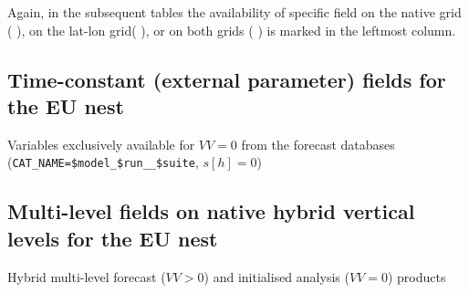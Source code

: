 Again, in the subsequent tables the availability of specific field on the native grid ($\,$\markRed$\,$), 
on the lat-lon grid($\,$\markBlue$\,$), or on both grids ($\,$\markRed\markBlue$\,$) is marked in the leftmost column.


\subsection{Time-constant (external parameter) fields for the EU nest}

\renewcommand{\onlyglb}[1]{}
\renewcommand{\onlyloc}[1]{#1}
%
\begin{vartable}{\caption{Variables exclusively available for $VV=0$ from the forecast databases (\texttt{CAT\_NAME=\$model\_\$run\_\_\$suite}, $s[h]=0$)}\label{table:nest:init_output}}

  

\end{vartable}


\subsection{Multi-level fields on native hybrid vertical levels for the EU nest}

\renewcommand{\onlyglb}[1]{}
\renewcommand{\onlyloc}[1]{#1}
%
\begin{vartable}{\caption{Hybrid multi-level forecast ($VV>0$) and initialised analysis ($VV=0$) products}}
  
  
  
\end{vartable}


